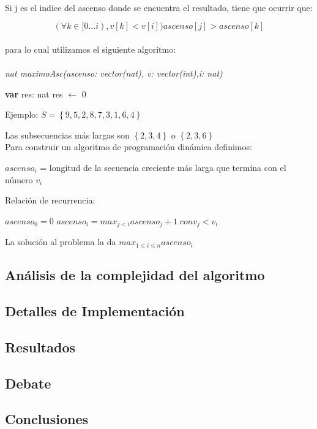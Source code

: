 \paragraph{}
Si j es el indice del ascenso donde se encuentra el resultado, tiene que ocurrir que:

$$(\forall k \in [0...i) , v[k]<v[i]) ascenso[j] > ascenso[k]$$


\paragraph{}
para lo cual utilizamos el siguiente algoritmo:


\paragraph{}
\textit{nat maximoAsc(ascenso: vector(nat), v: vector(int),i: nat)}\\
	\begin{algorithm}[H]
	
      \textbf{var} res: nat
      res $\leftarrow$ 0
	
  \end{algorithm}


Ejemplo:
$S = \left\lbrace 9,5,2,8,7,3,1,6,4\right\rbrace$ 

Las subsecuencias más largas son $\left\lbrace 2,3,4\right\rbrace$ o $\left\lbrace 2,3,6\right\rbrace$
\\
Para construir un algoritmo de programación dinámica definimos:

$ascenso_i$ = longitud de la secuencia creciente más larga que termina con el número $v_i$

Relación de recurrencia:

$ascenso_0 = 0$
$ascenso_i  = max_{j<i}  ascenso_j + 1 \;      con v_j < v_i  $

La solución al problema la da
$max_{1\leq i\leq n} ascenso_i$



\vspace*{30cm}
		









\subsection{Análisis de la complejidad del algoritmo}
\subsection{Detalles de Implementación}
\subsection{Resultados}
\label{Resultados1}
\subsection{Debate}
\subsection{Conclusiones}
